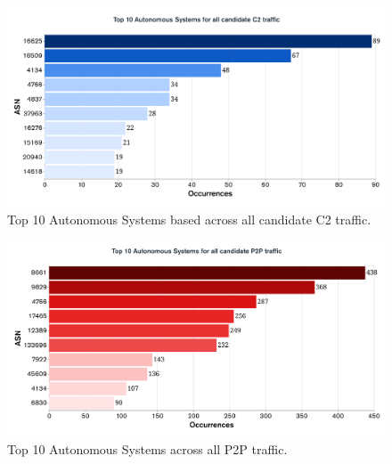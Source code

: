 \begin{appendices}
\begin{figure}[!htb]
    \centering
    \includegraphics[width=0.75\linewidth]{results/top_10_asn_c2.png}
    \caption{Top 10 Autonomous Systems based across all candidate C2 traffic.}
    \label{fig:top_10_asn_c2} 
\end{figure}

\begin{figure}[!htb]
    \centering
    \includegraphics[width=0.75\linewidth]{results/top_10_asn_p2p.png}
    \caption{Top 10 Autonomous Systems across all P2P traffic.}
    \label{fig:top_10_asn_p2p} 
\end{figure}


\end{appendices}